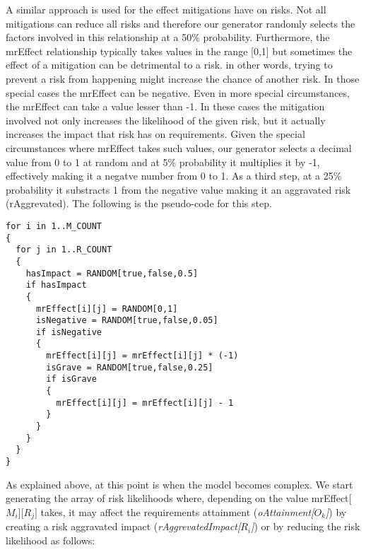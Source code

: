 A similar approach is used for the effect mitigations have on risks. Not all
mitigations can reduce all risks and therefore our generator randomly selects
the factors involved in this relationship at a 50\% probability. Furthermore,
the mrEffect relationship typically takes values in the range [0,1] but
sometimes the effect of a mitigation can be detrimental to a risk. in other
words, trying to prevent a risk from happening might increase the chance of
another risk. In those special cases the mrEffect can be negative. Even in more
special circumstances, the mrEffect can take a value lesser than -1. In these
cases the mitigation involved not only increases the likelihood of the given
risk, but it actually increases the impact that risk has on requirements. Given
the special circumstances where mrEffect takes such values, our generator
selects a decimal value from 0 to 1 at random and at 5\% probability it
multiplies it by -1, effectively making it a negatve number from 0 to 1. As a
third step, at a 25\% probability it substracts 1 from the negative value making
it an aggravated risk (rAggrevated). The following is the pseudo-code for this
step.

\begin{footnotesize}
\begin{verbatim}
for i in 1..M_COUNT
{
  for j in 1..R_COUNT
  {
    hasImpact = RANDOM[true,false,0.5]
    if hasImpact
    {
      mrEffect[i][j] = RANDOM[0,1]
      isNegative = RANDOM[true,false,0.05]
      if isNegative
      {
      	mrEffect[i][j] = mrEffect[i][j] * (-1)
      	isGrave = RANDOM[true,false,0.25]
      	if isGrave
      	{
      	  mrEffect[i][j] = mrEffect[i][j] - 1
        }
      }
    }
  }
}
\end{verbatim}
\end{footnotesize}

As explained above, at this point is when the model becomes complex. We start
generating the array of risk likelihoods where, depending 
on the value mrEffect[$M_i$][$R_j$] takes, it may affect the requirements attainment
(\textit{oAttainment[$O_k$]}) by creating a risk aggravated impact
(\textit{rAggrevatedImpact[$R_i$]}) or by reducing the risk
likelihood as follows:

